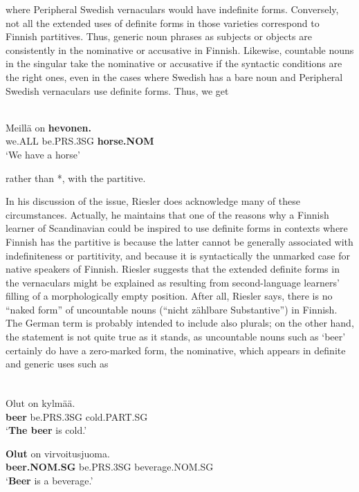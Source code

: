 \z

where Peripheral Swedish vernaculars would have indefinite forms. Conversely, not all the extended uses of definite forms in those varieties correspond to Finnish partitives. Thus, generic noun phrases as subjects or objects are consistently in the nominative or accusative in Finnish. Likewise, countable nouns in the singular take the nominative or accusative if the syntactic conditions are the right ones, even in the cases where Swedish has a bare noun and Peripheral Swedish vernaculars use definite forms. Thus, we get

\ea \label{} 
\\
\gll Meillä  on  \textbf{hevonen.} \\
we.ALL  be.PRS.3SG  \textbf{horse.NOM} \\
\glt ‘We have a horse’

\z

rather than *, with the partitive.

In his discussion of the issue, Riesler does acknowledge many of these circumstances. Actually, he maintains that one of the reasons why a Finnish learner of Scandinavian could be inspired to use definite forms in contexts where Finnish has the partitive is because the latter cannot be generally associated with indefiniteness or partitivity, and because it is syntactically the unmarked case for native speakers of Finnish. Riesler suggests that the extended definite forms in the vernaculars might be explained as resulting from second-language learners’ filling of a morphologically empty position. After all, Riesler says, there is no “naked form” of uncountable nouns (“nicht zählbare Substantive”) in Finnish. The German term is probably intended to include also plurals; on the other hand, the statement is not quite true as it stands, as uncountable nouns such as  ‘beer’ certainly do have a zero-marked form, the nominative, which appears in definite and generic uses such as

\ea\label{}
\\
\gll Olut  on\textsuperscript{  }kylmää.\\
\textbf{beer} be.PRS.3SG  cold.PART.SG\\
\glt ‘\textbf{The beer} is cold.’

\z

\ea
\gll \textbf{Olut} on  virvoitusjuoma.\\
\textbf{beer.NOM.SG} be.PRS.3SG  beverage.NOM.SG\\
\glt ‘\textbf{Beer} is a beverage.’

